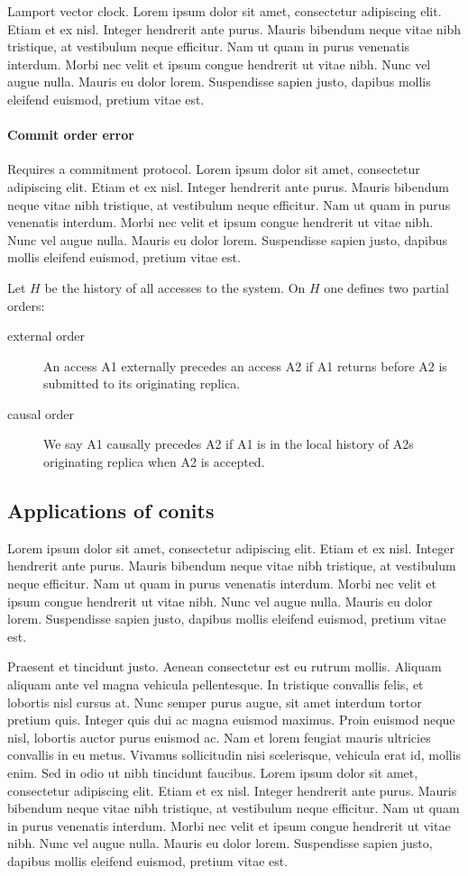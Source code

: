 Lamport vector clock. Lorem ipsum dolor sit amet, consectetur
adipiscing elit. Etiam et ex nisl. Integer hendrerit ante
purus. Mauris bibendum neque vitae nibh tristique, at vestibulum neque
efficitur. Nam ut quam in purus venenatis interdum. Morbi nec velit et
ipsum congue hendrerit ut vitae nibh. Nunc vel augue nulla. Mauris eu
dolor lorem. Suspendisse sapien justo, dapibus mollis eleifend
euismod, pretium vitae est.

\paragraph{Commit order error} Requires a commitment protocol. Lorem ipsum dolor sit amet,
consectetur adipiscing elit. Etiam et ex nisl. Integer hendrerit ante
purus. Mauris bibendum neque vitae nibh tristique, at vestibulum neque
efficitur. Nam ut quam in purus venenatis interdum. Morbi nec velit et
ipsum congue hendrerit ut vitae nibh. Nunc vel augue nulla. Mauris eu
dolor lorem. Suspendisse sapien justo, dapibus mollis eleifend
euismod, pretium vitae est.

Let $H$ be the history of all accesses to the system. On $H$ one
defines two partial orders:
\begin{description}
  \item[external order] An access A1 externally precedes an access A2 if A1 returns
  before A2 is submitted to its originating replica.
  \item[causal order] We say A1 causally precedes A2 if A1 is in the
    local history of A2s originating replica when A2 is accepted.
\end{description}

\subsection{Applications of conits}

Lorem ipsum dolor sit amet, consectetur adipiscing elit. Etiam et ex
nisl. Integer hendrerit ante purus. Mauris bibendum neque vitae nibh
tristique, at vestibulum neque efficitur. Nam ut quam in purus
venenatis interdum. Morbi nec velit et ipsum congue hendrerit ut vitae
nibh. Nunc vel augue nulla. Mauris eu dolor lorem. Suspendisse sapien
justo, dapibus mollis eleifend euismod, pretium vitae est.

Praesent et tincidunt justo. Aenean consectetur est eu rutrum
mollis. Aliquam aliquam ante vel magna vehicula pellentesque. In
tristique convallis felis, et lobortis nisl cursus at. Nunc semper
purus augue, sit amet interdum tortor pretium quis. Integer quis dui
ac magna euismod maximus. Proin euismod neque nisl, lobortis auctor
purus euismod ac. Nam et lorem feugiat mauris ultricies convallis in
eu metus. Vivamus sollicitudin nisi scelerisque, vehicula erat id,
mollis enim. Sed in odio ut nibh tincidunt faucibus.  Lorem ipsum
dolor sit amet, consectetur adipiscing elit. Etiam et ex nisl. Integer
hendrerit ante purus. Mauris bibendum neque vitae nibh tristique, at
vestibulum neque efficitur. Nam ut quam in purus venenatis
interdum. Morbi nec velit et ipsum congue hendrerit ut vitae
nibh. Nunc vel augue nulla. Mauris eu dolor lorem. Suspendisse sapien
justo, dapibus mollis eleifend euismod, pretium vitae est.

